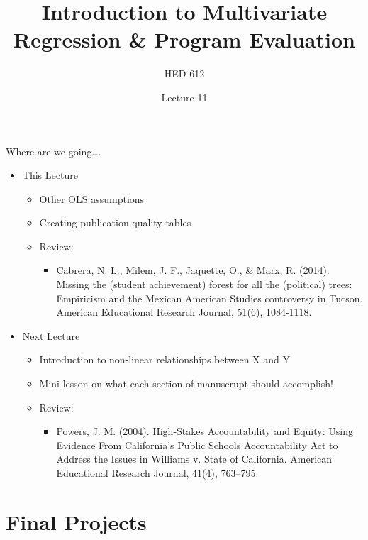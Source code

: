 \documentclass[8pt,ignorenonframetext,dvipsnames]{beamer}
\title{Introduction to Multivariate Regression \& Program Evaluation}
\subtitle{HED 612}
\author{Lecture 11}
\date{}
\providecommand{\tightlist}{%
  \setlength{\itemsep}{0pt}\setlength{\parskip}{0pt}}
\let\olditem\item
\renewcommand{\item}{%
  \olditem\vspace{4pt}
}
\begin{document}
\frame{\titlepage}

\begin{frame}
\tableofcontents[hideallsubsections]
\end{frame}
\begin{frame}{Where are we going\ldots{}.}
\protect\hypertarget{where-are-we-going.}{}

\begin{itemize}
\tightlist
\item
  This Lecture

  \begin{itemize}
  \tightlist
  \item
    Other OLS assumptions
  \item
    Creating publication quality tables
  \item
    Review:

    \begin{itemize}
    \tightlist
    \item
      Cabrera, N. L., Milem, J. F., Jaquette, O., \& Marx, R. (2014).
      Missing the (student achievement) forest for all the (political)
      trees: Empiricism and the Mexican American Studies controversy in
      Tucson. American Educational Research Journal, 51(6), 1084-1118.
    \end{itemize}
  \end{itemize}
\item
  Next Lecture

  \begin{itemize}
  \tightlist
  \item
    Introduction to non-linear relationships between X and Y
  \item
    Mini lesson on what each section of manuscrupt should accomplish!
  \item
    Review:

    \begin{itemize}
    \tightlist
    \item
      Powers, J. M. (2004). High-Stakes Accountability and Equity: Using
      Evidence From California's Public Schools Accountability Act to
      Address the Issues in Williams v. State of California. American
      Educational Research Journal, 41(4), 763--795.
    \end{itemize}
  \end{itemize}
\end{itemize}

\end{frame}

\hypertarget{final-projects}{%
\section{Final Projects}\label{final-projects}}
\end{document}
